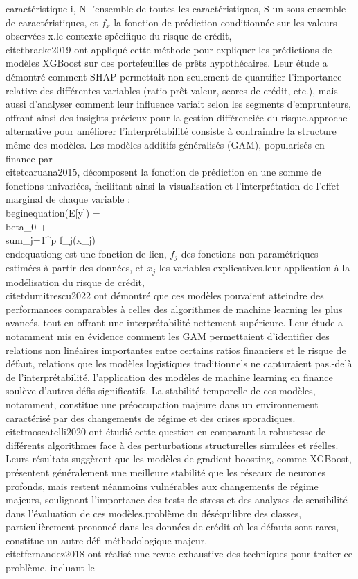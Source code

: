 caractéristique i, N l'ensemble de toutes les caractéristiques, S un sous-ensemble de caractéristiques, et $f_x$ la fonction de prédiction conditionnée sur les valeurs observées x.\n\nDans le contexte spécifique du risque de crédit, \\citet{bracke2019} ont appliqué cette méthode pour expliquer les prédictions de modèles XGBoost sur des portefeuilles de prêts hypothécaires. Leur étude a démontré comment SHAP permettait non seulement de quantifier l'importance relative des différentes variables (ratio prêt-valeur, scores de crédit, etc.), mais aussi d'analyser comment leur influence variait selon les segments d'emprunteurs, offrant ainsi des insights précieux pour la gestion différenciée du risque.\n\nUne approche alternative pour améliorer l'interprétabilité consiste à contraindre la structure même des modèles. Les modèles additifs généralisés (GAM), popularisés en finance par \\citet{caruana2015}, décomposent la fonction de prédiction en une somme de fonctions univariées, facilitant ainsi la visualisation et l'interprétation de l'effet marginal de chaque variable :\n\n\\begin{equation}\ng(E[y]) = \\beta_0 + \\sum_{j=1}^p f_j(x_j)\n\\end{equation}\n{} g est une fonction de lien, $f_j$ des fonctions non paramétriques estimées à partir des données, et $x_j$ les variables explicatives.\n\nDans leur application à la modélisation du risque de crédit, \\citet{dumitrescu2022} ont démontré que ces modèles pouvaient atteindre des performances comparables à celles des algorithmes de machine learning les plus avancés, tout en offrant une interprétabilité nettement supérieure. Leur étude a notamment mis en évidence comment les GAM permettaient d'identifier des relations non linéaires importantes entre certains ratios financiers et le risque de défaut, relations que les modèles logistiques traditionnels ne capturaient pas.\n\nAu-delà de l'interprétabilité, l'application des modèles de machine learning en finance soulève d'autres défis significatifs. La stabilité temporelle de ces modèles, notamment, constitue une préoccupation majeure dans un environnement caractérisé par des changements de régime et des crises sporadiques. \\citet{moscatelli2020} ont étudié cette question en comparant la robustesse de différents algorithmes face à des perturbations structurelles simulées et réelles. Leurs résultats suggèrent que les modèles de gradient boosting, comme XGBoost, présentent généralement une meilleure stabilité que les réseaux de neurones profonds, mais restent néanmoins vulnérables aux changements de régime majeurs, soulignant l'importance des tests de stress et des analyses de sensibilité dans l'évaluation de ces modèles.\n\nLe problème du déséquilibre des classes, particulièrement prononcé dans les données de crédit où les défauts sont rares, constitue un autre défi méthodologique majeur. \\citet{fernandez2018} ont réalisé une revue exhaustive des techniques pour traiter ce problème, incluant le 
